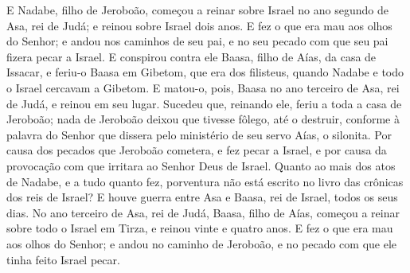 E Nadabe, filho de Jeroboão, começou a reinar sobre Israel no ano
segundo de Asa, rei de Judá; e reinou sobre Israel dois anos.
E fez o que era mau aos olhos do Senhor; e andou nos caminhos
de seu pai, e no seu pecado com que seu pai fizera pecar a Israel.
E conspirou contra ele Baasa, filho de Aías, da casa de
Issacar, e feriu-o Baasa em Gibetom, que era dos filisteus, quando
Nadabe e todo o Israel cercavam a Gibetom. E matou-o, pois,
Baasa no ano terceiro de Asa, rei de Judá, e reinou em seu lugar.
Sucedeu que, reinando ele, feriu a toda a casa de Jeroboão;
nada de Jeroboão deixou que tivesse fôlego, até o destruir, conforme
à palavra do Senhor que dissera pelo ministério de seu servo Aías, o
silonita. Por causa dos pecados que Jeroboão cometera, e fez
pecar a Israel, e por causa da provocação com que irritara ao Senhor
Deus de Israel. Quanto ao mais dos atos de Nadabe, e a tudo
quanto fez, porventura não está escrito no livro das crônicas dos
reis de Israel? E houve guerra entre Asa e Baasa, rei de
Israel, todos os seus dias. No ano terceiro de Asa, rei de
Judá, Baasa, filho de Aías, começou a reinar sobre todo o Israel em
Tirza, e reinou vinte e quatro anos. E fez o que era mau aos
olhos do Senhor; e andou no caminho de Jeroboão, e no pecado com que
ele tinha feito Israel pecar.

\medskip

